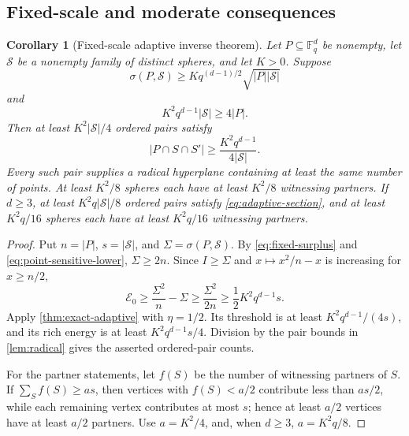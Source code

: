 \documentclass[11pt,letterpaper]{amsart}
\newtheorem{corollary}[corollary]{Corollary}
\theoremstyle{definition}
\theoremstyle{remark}
\newcommand{\1}{\mathbf 1}
\begin{document}
\subsection{Fixed-scale and moderate consequences}

\begin{corollary}[Fixed-scale adaptive inverse theorem]\label{cor:fixed-adaptive}
Let $P\subseteq\mathbb F_q^d$ be nonempty, let $\mathcal S$ be a nonempty family of distinct spheres, and let $K>0$.  Suppose
\begin{equation}\label{eq:fixed-surplus}
 \sigma(P,\mathcal S)\ge Kq^{(d-1)/2}\sqrt{|P||\mathcal S|}
\end{equation}
and
\begin{equation}\label{eq:point-sensitive-lower}
 K^2q^{d-1}|\mathcal S|\ge4|P|.
\end{equation}
Then at least $K^2|\mathcal S|/4$ ordered pairs satisfy
\begin{equation}\label{eq:adaptive-section}
 |P\cap S\cap S'|\ge
 \frac{K^2q^{d-1}}{4|\mathcal S|}.
\end{equation}
Every such pair supplies a radical hyperplane containing at least the same number of points.  At least $K^2/8$ spheres each have at least $K^2/8$ witnessing partners.  If $d\ge3$, at least $K^2q|\mathcal S|/8$ ordered pairs satisfy \eqref{eq:adaptive-section}, and at least $K^2q/16$ spheres each have at least $K^2q/16$ witnessing partners.
\end{corollary}

\begin{proof}
Put $n=|P|$, $s=|\mathcal S|$, and $\Sigma=\sigma(P,\mathcal S)$.  By \eqref{eq:fixed-surplus} and \eqref{eq:point-sensitive-lower}, $\Sigma\ge2n$.  Since $I\ge\Sigma$ and $x\mapsto x^2/n-x$ is increasing for $x\ge n/2$,
\[
 \mathcal E_0\ge\frac{\Sigma^2}{n}-\Sigma
 \ge\frac{\Sigma^2}{2n}
 \ge\frac12K^2q^{d-1}s.
\]
Apply \cref{thm:exact-adaptive} with $\eta=1/2$.  Its threshold is at least $K^2q^{d-1}/(4s)$, and its rich energy is at least $K^2q^{d-1}s/4$.  Division by the pair bounds in \cref{lem:radical} gives the asserted ordered-pair counts.

For the partner statements, let $f(S)$ be the number of witnessing partners of $S$.  If $\sum_S f(S)\ge as$, then vertices with $f(S)<a/2$ contribute less than $as/2$, while each remaining vertex contributes at most $s$; hence at least $a/2$ vertices have at least $a/2$ partners.  Use $a=K^2/4$, and, when $d\ge3$, $a=K^2q/8$.
\end{proof}
\end{document}
